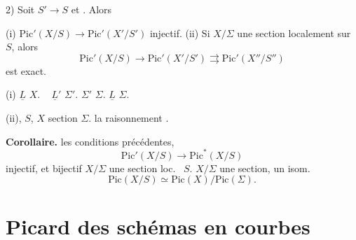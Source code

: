 \documentclass[11pt,a4paper]{article}
\begin{document}
2) Soit $S' \to S$  et . Alors

(i) $\mathrm{Pic}'(X/S) \to \mathrm{Pic}'(X'/S')$ 
injectif. (ii) Si $X/\Sigma$  \struck{\ill{}} une section
\struck{\ill{}} localement sur $S$, alors
\[
  \mathrm{Pic}'(X/S) \to \mathrm{Pic}'(X'/S') \rightrightarrows
  \mathrm{Pic}'(X''/S'')
\]
est exact.

   (i) \uncertain{\ill{}}
 $\underline{L}$  $X$.  \  
$\underline{L}'$   $\Sigma'$. 
$\Sigma'$   
 $\Sigma$.   
$\underline{L}$   $\Sigma$.

 (ii),  
    $S$,
    
$X$   section  $\Sigma$. 
  la  
   
raisonnement .

\textbf{Corollaire.}  les conditions précédentes,
\[
  \mathrm{Pic}'(X/S) \to \mathrm{Pic}^{*}(X/S)
\]
 injectif, et  bijectif  $X/\Sigma$
\struck{\ill{}}  une section loc.\  $S$.
 $X/\Sigma$  une section,  un isom.
\[
  \mathrm{Pic}(X/S) \simeq \mathrm{Pic}(X)/\mathrm{Pic}(\Sigma).
\]

\section{Picard des schémas en courbes}
\end{document}
